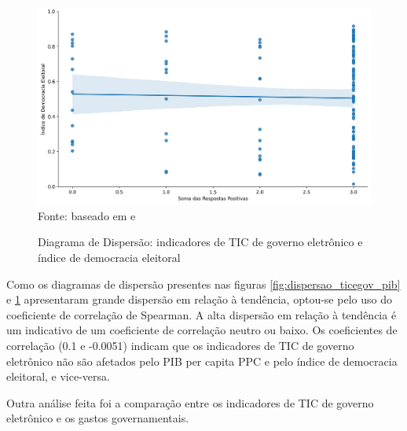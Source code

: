 \begin{figure}[H]
	\centering
	\caption{Diagrama de Dispersão: indicadores de TIC de governo eletrônico e índice de democracia eleitoral}
	\includegraphics[width=1\linewidth]{figuras/ict_in_government/dispersao_ticegov_indicedemocracia}
	\label{fig:dispersao_ticegov_indicedemocracia}
	\footnotesize{Fonte: baseado em \cite{electoral_democracy_index} e \cite{ONU_ICT_in_government_indicators}}
\end{figure}

Como os diagramas de dispersão presentes nas figuras \ref{fig:dispersao_ticegov_pib} e \ref{fig:dispersao_ticegov_indicedemocracia}  apresentaram grande dispersão em relação à tendência, optou-se pelo uso do coeficiente de correlação de Spearman. A alta dispersão em relação à tendência é um indicativo de um coeficiente de correlação neutro ou baixo. Os coeficientes de correlação (0.1 e -0.0051) indicam que os indicadores de TIC de governo eletrônico não são afetados pelo PIB per capita PPC e pelo índice de democracia eleitoral, e vice-versa.

Outra análise feita foi a comparação entre os indicadores de TIC de governo eletrônico e os gastos governamentais.

